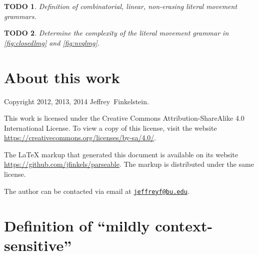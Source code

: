 \documentclass{article}
\newtheorem{todo}{TODO}
\theoremstyle{definition}
\newcommand{\email}[1]{\href{mailto:#1}{\nolinkurl{#1}}}
\begin{document}
\begin{todo}
  Definition of combinatorial, linear, non-erasing literal movement grammars.
\end{todo}
\begin{todo}
  Determine the complexity of the literal movement grammar in \autoref{fig:closedlmg} and \autoref{fig:nvqlmg}.
\end{todo}

\section{About this work}

Copyright 2012, 2013, 2014 Jeffrey~Finkelstein.

This work is licensed under the Creative Commons Attribution-ShareAlike 4.0 International License.
To view a copy of this license, visit the website \mbox{\url{https://creativecommons.org/licenses/by-sa/4.0/}}.

The \LaTeX{} markup that generated this document is available on its website \mbox{\url{https://github.com/jfinkels/parseable}}.
The markup is distributed under the same license.

The author can be contacted via email at \email{jeffreyf@bu.edu}.




\appendix
\section{Definition of ``mildly context-sensitive''}
\label{app:definitions}
\end{document}
